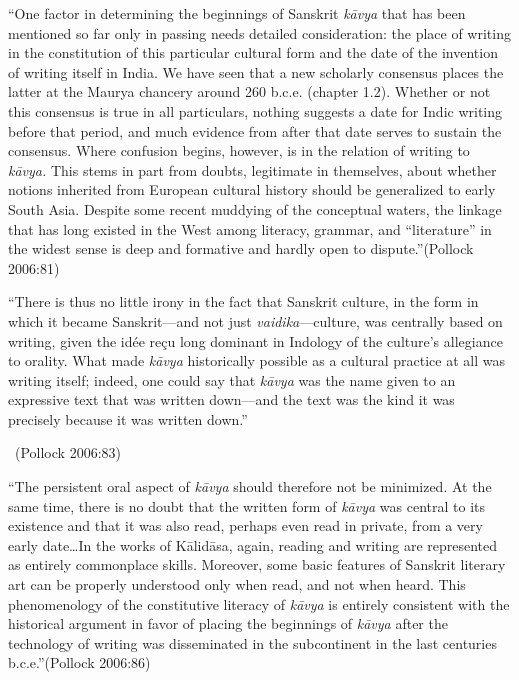 \begin{myquote}
“One factor in determining the beginnings of Sanskrit \textit{kāvya} that has been mentioned so far only in passing needs detailed consideration: the place of writing in the constitution of this particular cultural form and the date of the invention of writing itself in India. We have seen that a new scholarly consensus places the latter at the Maurya chancery around 260 b.c.e. (chapter 1.2). Whether or not this consensus is true in all particulars, nothing suggests a date for Indic writing before that period, and much evidence from after that date serves to sustain the consensus. Where confusion begins, however, is in the relation of writing to \textit{kāvya.} This stems in part from doubts, legitimate in themselves, about whether notions inherited from European cultural history should be generalized to early South Asia. Despite some recent muddying of the conceptual waters, the linkage that has long existed in the West among literacy, grammar, and “literature” in the widest sense is deep and formative and hardly open to dispute.”\hfill (Pollock 2006:81)
\end{myquote}

\begin{myquote}
“There is thus no little irony in the fact that Sanskrit culture, in the form in which it became Sanskrit—and not just \textit{vaidika}—culture, was centrally based on writing, given the idée reçu long dominant in Indology of the culture’s allegiance to orality. What made \textit{kāvya} historically possible as a cultural practice at all was writing itself; indeed, one could say that \textit{kāvya} was the name given to an expressive text that was written down—and the text was the kind it was precisely because it was written down.”

~\hfill (Pollock 2006:83)
\end{myquote}

\begin{myquote}
“The persistent oral aspect of \textit{kāvya} should therefore not be minimized. At the same time, there is no doubt that the written form of \textit{kāvya} was central to its existence and that it was also read, perhaps even read in private, from a very early date…In the works of Kālidāsa, again, reading and writing are represented as entirely commonplace skills. Moreover, some basic features of Sanskrit literary art can be properly understood only when read, and not when heard. This phenomenology of the constitutive literacy of \textit{kāvya} is entirely consistent with the historical argument in favor of placing the beginnings of \textit{kāvya} after the technology of writing was disseminated in the subcontinent in the last centuries b.c.e.”\hfill (Pollock 2006:86)
\end{myquote}


